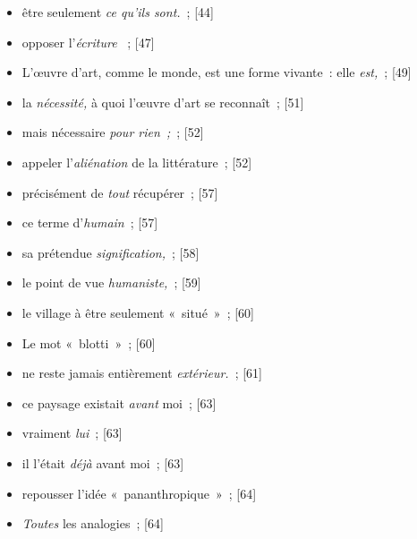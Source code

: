 \documentclass[12pt, a4paper]{article}
\begin{document}
\begin{itemize}
    \item être seulement \textit{ce qu’ils sont.}{\color{gray}~; [44]}

    \item opposer l’\textit{écriture }{\color{gray}~; [47]}

    \item L’œuvre d’art, comme le monde, est une forme vivante~: elle \textit{est,}{\color{gray}~; [49]}

    \item la \textit{nécessité,} à quoi l’œuvre d’art se reconnaît{\color{gray}~; [51]}

    \item mais nécessaire \textit{pour rien~;}{\color{gray}~; [52]}

    \item appeler l’\textit{aliénation} de la littérature{\color{gray}~; [52]}

    \item précisément de \textit{tout} récupérer{\color{gray}~; [57]}

    \item ce terme d’\textit{humain}{\color{gray}~; [57]}

    \item sa prétendue \textit{signification,}{\color{gray}~; [58]}

    \item le point de vue \textit{humaniste,}{\color{gray}~; [59]}

    \item le village à être seulement «~situé~»{\color{gray}~; [60]}

    \item Le mot «~blotti~»{\color{gray}~; [60]}

    \item ne reste jamais entièrement \textit{extérieur.}{\color{gray}~; [61]}

    \item ce paysage existait \textit{avant }moi{\color{gray}~; [63]}

    \item vraiment \textit{lui}{\color{gray}~; [63]}

    \item il l’était \textit{déjà }avant moi{\color{gray}~; [63]}

    \item  repousser l’idée «~pananthropique~»{\color{gray}~; [64]}

    \item \textit{Toutes} les analogies{\color{gray}~; [64]}


\end{itemize}
\end{document}

